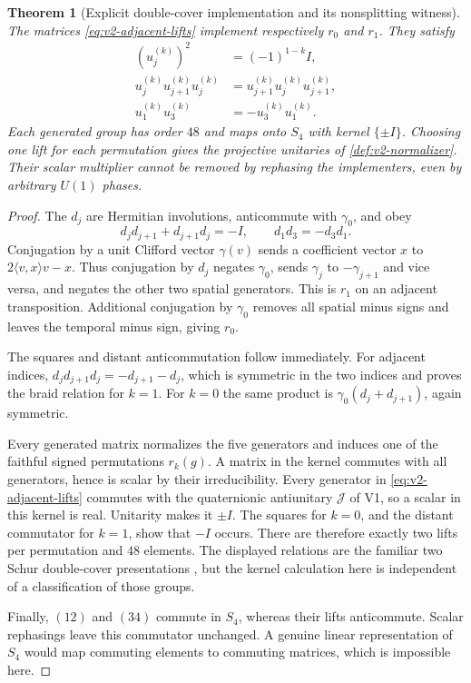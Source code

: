 \documentclass[11pt]{article}
\newtheorem{theorem}{Theorem}[section]
\theoremstyle{definition}
\theoremstyle{remark}
\newcommand{\ip}[2]{\langle#1,#2\rangle}
\newcommand{\Jq}{\mathcal J}
\begin{document}
\begin{theorem}[Explicit double-cover implementation and its nonsplitting witness]
\label{thm:v2-double-cover}
The matrices \eqref{eq:v2-adjacent-lifts} implement respectively $r_0$
and $r_1$. They satisfy
\begin{align}
 (u_j^{(k)})^2&=(-1)^{1-k}I,\\
 u_j^{(k)}u_{j+1}^{(k)}u_j^{(k)}
 &=u_{j+1}^{(k)}u_j^{(k)}u_{j+1}^{(k)},\\
 u_1^{(k)}u_3^{(k)}&=-u_3^{(k)}u_1^{(k)}.
 \label{eq:v2-Schur-relations}
\end{align}
Each generated group has order $48$ and maps onto $S_4$ with kernel
$\{\pm I\}$. Choosing one lift for each permutation gives the projective
unitaries of \cref{def:v2-normalizer}. Their scalar multiplier cannot be
removed by rephasing the implementers, even by arbitrary $U(1)$ phases.
\end{theorem}
\begin{proof}
The $d_j$ are Hermitian involutions, anticommute with $\gamma_0$, and obey
\[
 d_jd_{j+1}+d_{j+1}d_j=-I,\qquad d_1d_3=-d_3d_1.
\]
Conjugation by a unit Clifford vector $\gamma(v)$ sends a coefficient vector
$x$ to $2\ip{v}{x}v-x$. Thus conjugation by $d_j$ negates $\gamma_0$,
sends $\gamma_j$ to $-\gamma_{j+1}$ and vice versa, and negates the other
two spatial generators. This is $r_1$ on an adjacent transposition.
Additional conjugation by $\gamma_0$ removes all spatial minus signs and
leaves the temporal minus sign, giving $r_0$.

The squares and distant anticommutation follow immediately. For adjacent
indices, $d_jd_{j+1}d_j=-d_{j+1}-d_j$, which is symmetric in the two
indices and proves the braid relation for $k=1$. For $k=0$ the same product
is $\gamma_0(d_j+d_{j+1})$, again symmetric.

Every generated matrix normalizes the five generators and induces one of the
faithful signed permutations $r_k(g)$. A matrix in the kernel commutes with
all generators, hence is scalar by their irreducibility. Every generator in
\eqref{eq:v2-adjacent-lifts} commutes with the quaternionic antiunitary
$\Jq$ of V1, so a scalar in this kernel is real. Unitarity makes it $\pm I$.
The squares for $k=0$, and the distant commutator for $k=1$, show that $-I$
occurs. There are therefore exactly two lifts per permutation and $48$
elements. The displayed relations are the familiar two Schur double-cover
presentations \cite{ReichsteinShukla}, but the kernel calculation here is
independent of a classification of those groups.

Finally, $(12)$ and $(34)$ commute in $S_4$, whereas their lifts anticommute.
Scalar rephasings leave this commutator unchanged. A genuine linear
representation of $S_4$ would map commuting elements to commuting matrices,
which is impossible here.
\end{proof}
\end{document}
